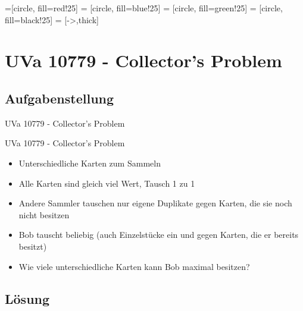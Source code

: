 

=[circle, fill=red!25]
 = [circle, fill=blue!25]
 = [circle, fill=green!25]
 = [circle, fill=black!25]
 = [->,thick]


\section{UVa 10779 - Collector's Problem}
\subsection{Aufgabenstellung}
    \begin{frame}{UVa 10779 - Collector's Problem}
        \begin{block}{UVa 10779 - Collector's Problem}
            \begin{itemize}
                \item Unterschiedliche Karten zum Sammeln
                \pause\item Alle Karten sind gleich viel Wert, Tausch 1 zu 1
                \pause\item Andere Sammler tauschen nur eigene Duplikate gegen Karten,
                die sie noch nicht besitzen
                \pause\item Bob tauscht beliebig (auch Einzelstücke ein und gegen
                Karten, die er bereits besitzt)
                \pause\item Wie viele unterschiedliche Karten kann Bob maximal besitzen?
            \end{itemize}
        \end{block}
    \end{frame}

\subsection{Lösung}

